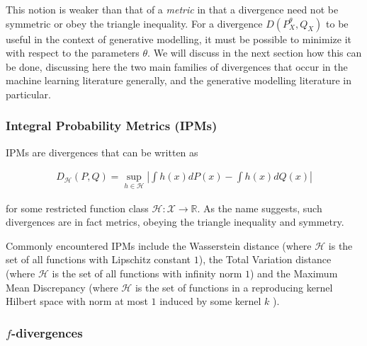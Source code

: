 This notion is weaker than that of a \emph{metric} in that a divergence need not be symmetric or obey the triangle inequality.
For a divergence $D(P^\theta_X, Q_X)$ to be useful in the context of generative modelling, it must be possible to minimize it with respect to the parameters $\theta$. 
We will discuss in the next section how this can be done, discussing here the two main families 
of divergences that occur in the machine learning literature generally, and the generative modelling literature in particular. 

\subsubsection{Integral Probability Metrics (IPMs)}


IPMs are divergences that can be written as

\begin{align*}
D_{\mathcal{H}}(P, Q) = \sup_{h\in\mathcal{H}} \left| \int h(x) dP(x) - \int h(x) dQ(x) \right|
\end{align*}

for some restricted function class $\mathcal{H}: \mathcal{X} \to \mathbb{R}$. 
As the name suggests, such divergences are in fact metrics, obeying the triangle inequality and symmetry.

Commonly encountered IPMs include the Wasserstein distance (where $\mathcal{H}$ is the set of all functions with Lipschitz constant $1$), the Total Variation distance (where $\mathcal{H}$ is the set of all functions with infinity norm $1$) and the Maximum Mean Discrepancy (where $\mathcal{H}$ is the set of functions in a reproducing kernel Hilbert space with norm at most $1$ induced by some kernel $k$ \cite{gretton}).

\subsubsection{$f$-divergences}


